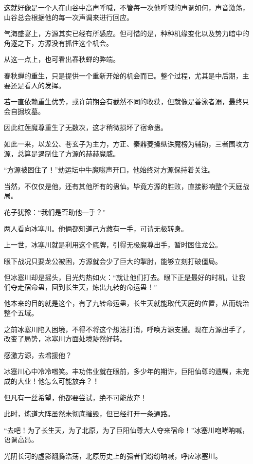 \begin{this_body}
这就好像是一个人在山谷中高声呼喊，不管每一次他呼喊的声调如何，声音激荡，山谷总会根据他的每一次声调来进行回应。

气海盛宴上，方源其实已经有所感应。但可惜的是，种种机缘变化以及势力暗中的角逐之下，方源没有抓住这个机会。

从这一点上，也可看出春秋蝉的弊端。

春秋蝉的重生，只是提供一个重新开始的机会而已。整个过程，尤其是中后期，主要还是看人的发挥。

若一直依赖重生优势，或许前期会有截然不同的收获，但就像是善泳者溺，最终只会自掘坟墓。

因此红莲魔尊重生了无数次，这才稍微损坏了宿命蛊。

如此一来，以龙公、苍玄子为主力，方正、秦鼎菱操纵诛魔榜为辅助，三者围攻方源，总算是遏制住了方源的赫赫魔威。

“方源被困住了！”劫运坛中牛魔嗡声开口，他始终对方源保持着关注。

当然，不仅仅是他，还有其他所有的蛊仙。毕竟方源的胜败，直接影响整个天庭战局。

花子犹豫：“我们是否助他一手？”

两人看向冰塞川。他俩都知道己方藏有一手，可请无极转身。

上一世，冰塞川就是利用这个底牌，引得无极魔尊出手，暂时困住龙公。

眼下战况只要龙公被困，方源就会少了巨大的掣肘，能够立刻打破僵局。

但冰塞川却是摇头，目光灼热如火：“就让他们打去。眼下正是最好的时机，让我们夺走宿命蛊，回到长生天，炼出九转的命运蛊！”

他本来的目的就是这个，有了九转命运蛊，长生天就能取代天庭的位置，从而统治整个五域。

之前冰塞川陷入困境，不得不将这个想法打消，呼唤方源支援。现在方源出手了，改变了局势，冰塞川方面处境陡然好转。

感激方源，去增援他？

冰塞川心中冷冷嗤笑。丰功伟业就在眼前，多少年的期许，巨阳仙尊的遗嘱，未完成的大业！他怎么可能放弃？！

但凡有一丝希望，他都要尝试，绝不可能放弃！

此时，炼道大阵虽然未彻底摧毁，但已经打开一条通路。

“去吧！为了长生天，为了北原，为了巨阳仙尊大人夺来宿命！”冰塞川咆哮呐喊，语调高昂。

光阴长河的虚影翻腾浩荡，北原历史上的强者们纷纷呐喊，呼应冰塞川。


\end{this_body}
